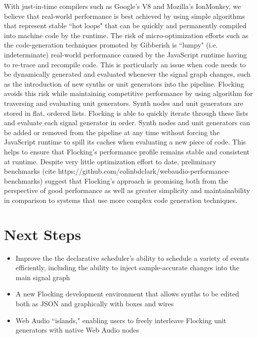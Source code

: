 \documentclass{article}
\begin{document}
With just-in-time compilers such as Google's V8 and Mozilla's IonMonkey, we believe that real-world performance is best achieved by using simple algorithms that represent stable ``hot loops" that can be quickly and permanently  compiled into machine code by the runtime. The risk of micro-optimization efforts such as the code-generation techniques promoted by Gibberish is ``lumpy" (i.e. indeterminate) real-world performance caused by the JavaScript runtime having to re-trace and recompile code. This is particularly an issue when code needs to be dynamically generated and evaluated whenever the signal graph changes, such as the introduction of new synths or unit generators into the pipeline. Flocking avoids this risk while maintaining competitive performance by using algorithm for traversing and evaluating unit generators. Synth nodes and unit generators are stored in flat, ordered lists. Flocking is able to quickly iterate through these lists and evaluate each signal generator in order. Synth nodes and unit generators can be added or removed from the pipeline at any time without forcing the JavaScript runtime to spill its caches when evaluating a new piece of code. This helps to ensure that Flocking's performance profile remains stable and consistent at runtime. Despite very little optimization effort to date, preliminary benchmarks (cite https://github.com/colinbdclark/webaudio-performance-benchmarks) suggest that Flocking's approach is promising both from the perspective of good performance as well as greater simplicity and maintainability in comparison to systems that use more complex code generation techniques.

\section{Next Steps}

\begin{itemize}
  \item Improve the the declarative scheduler's ability to schedule a variety of events efficiently, including the ability to inject sample-accurate changes into the main signal graph
  \item A new Flocking development environment that allows synths to be edited both as JSON and graphically with boxes and wires
  \item Web Audio ``islands," enabling users to freely interleave Flocking unit generators with native Web Audio nodes
\end{itemize}
\end{document}
